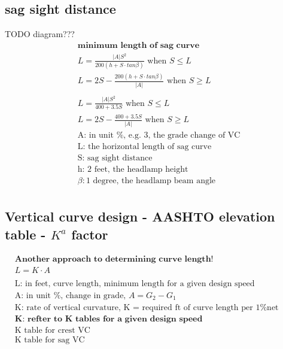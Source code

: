 \documentclass{article}
\begin{document}
  \subsection{sag sight distance}
  TODO diagram??? \\
  \begin{align*}
    & \textbf{minimum length of sag curve} \\
    & L = \frac{|A|S^2}{200(h + S \cdot tan \beta)}   \text{ when } S \leq L \\
    & L = 2S - \frac{200(h + S \cdot tan \beta)}{|A|} \text{ when } S \geq L \\
    \\
    & L = \frac{|A|S^2}{400 + 3.5S} \text{ when } S \leq L \\
    & L = 2S - \frac{400 + 3.5S}{|A|} \text{ when } S \geq L \\
    & \text{A: in unit \%, e.g. 3, the grade change of VC}\\
    & \text{L: the horizontal length of sag curve}\\
    & \text{S: sag sight distance} \\
    & \text{h: 2 feet, the headlamp height}\\
    & \beta: \text{1 degree, the headlamp beam angle}\\
  \end{align*}

  \subsection{Vertical curve design - AASHTO elevation table - $K^a$ factor}
  \begin{align*}
    & \textbf{Another approach to determining curve length! }\\
    &  L = K \cdot A \\
    \\
    & \text{L: in feet, curve length, minimum length for a given design speed }\\
    & \text{A: in unit \%, change in grade, } A= G_2 - G_1\\
    & \text{K: rate of vertical curvature, K = required ft of curve length per 1\% net change in grade }\\
    & \textbf{K: refter to K tables for a given design speed}\\
    & \text{K table for crest VC }\\
    & \text{K table for sag VC }
  \end{align*}
\end{document}

